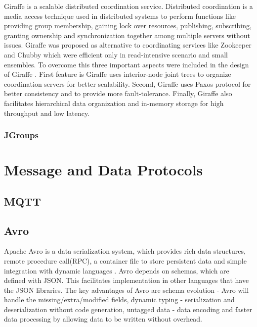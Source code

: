 {     Giraffe is a scalable distributed coordination
     service. Distributed coordination is a media access technique
     used in distributed systems to perform functions like providing
     group membership, gaining lock over resources, publishing,
     subscribing, granting ownership and synchronization together
     among multiple servers without issues. Giraffe was proposed as
     alternative to coordinating services like Zookeeper and Chubby
     which were efficient only in read-intensive scenario and small
     ensembles. To overcome this three important aspects were included
     in the design of Giraffe \cite{giraffePaper}. First feature is
     Giraffe uses interior-node joint trees to organize coordination
     servers for better scalability. Second, Giraffe uses Paxos
     protocol for better consistency and to provide more
     fault-tolerance. Finally, Giraffe also facilitates hierarchical
     data organization and in-memory storage for high throughput and
     low latency.
     
\subsubsection{JGroups}

\section{Message and Data Protocols}
\label{S:o-protocols}

\subsection{MQTT}

\subsection{Avro}

     Apache Avro is a data serialization system, which provides rich
     data structures, remote procedure call(RPC), a container file to
     store persistent data and simple integration with dynamic
     languages \cite{www-Avro}.  Avro depends on schemas, which are
     defined with JSON. This facilitates implementation in other
     languages that have the JSON libraries.  The key advantages of
     Avro are schema evolution - Avro will handle the
     missing/extra/modified fields, dynamic typing - serialization and
     deserialization without code generation, untagged data - data
     encoding and faster data processing by allowing data to be
     written without overhead.
     
}
